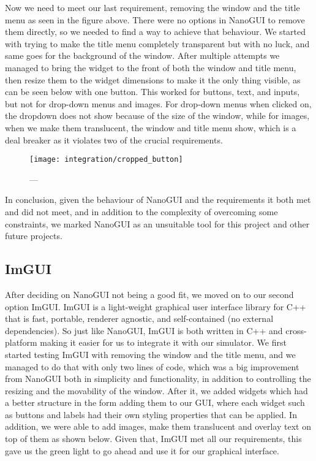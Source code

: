 Now we need to meet our last requirement, removing the window and the title menu as seen in the figure above. There were no options in NanoGUI to remove them directly, so we needed to find a way to achieve that behaviour. We started with trying to make the title menu completely transparent but with no luck, and same goes for the background of the window. After multiple attempts we managed to bring the widget to the front of both the window and title menu, then resize them to the widget dimensions to make it the only thing visible, as can be seen below with one button. This worked for buttons, text, and inputs, but not for drop-down menus and images. For drop-down menus when clicked on, the dropdown does not show because of the size of the window, while for images, when we make them translucent, the window and title menu show, which is a deal breaker as it violates two of the crucial requirements.

\begin{figure}
  \centering%
  \texttt{[image: integration/cropped\_button]}
  \caption{---}\label{fig:}
\end{figure}

In conclusion, given the behaviour of NanoGUI and the requirements it both met and did not meet, and in addition to the complexity of overcoming some constraints, we marked NanoGUI as an unsuitable tool for this project and other future projects.

\subsection{ImGUI}\label{ssec:imgui}
After deciding on NanoGUI not being a good fit, we moved on to our second option ImGUI. ImGUI is a light-weight graphical user interface library for C++ that is fast, portable, renderer agnostic, and self-contained (no external dependencies). So just like NanoGUI, ImGUI is both written in C++ and cross-platform making it easier for us to integrate it with our simulator. We first started testing ImGUI with removing the window and the title menu, and we managed to do that with only two lines of code, which was a big improvement from NanoGUI both in simplicity and functionality, in addition to controlling the resizing and the movability of the window. After it, we added widgets which had a better structure in the form adding them to our GUI, where each widget such as buttons and labels had their own styling properties that can be applied. In addition, we were able to add images, make them translucent and overlay text on top of them as shown below. Given that, ImGUI met all our requirements, this gave us the green light to go ahead and use it for our graphical interface.

